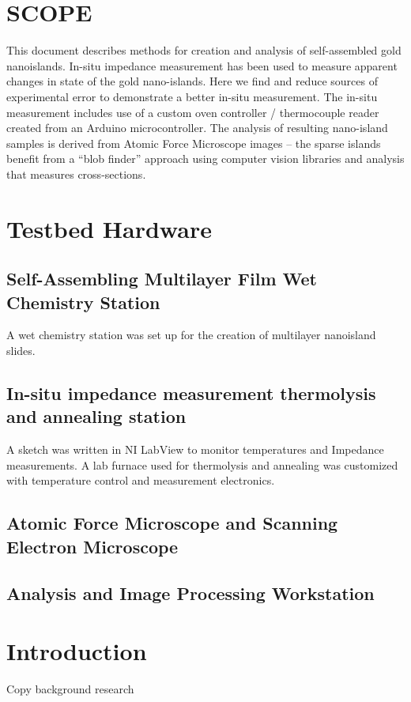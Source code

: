 \documentclass[12pt,oneside,english]{article}
\begin{document}
\section{SCOPE}
    This document describes methods for creation and analysis of self-assembled gold nanoislands.
    In-situ impedance measurement has been used to measure apparent changes in state of the gold nano-islands.
    Here we find and reduce sources of experimental error to demonstrate a better in-situ measurement.
    The in-situ measurement includes use of a custom oven controller / thermocouple reader created from an Arduino microcontroller.
    The analysis of resulting nano-island samples is derived from Atomic Force Microscope images -- the sparse islands benefit from a ``blob finder'' approach using computer vision libraries and analysis that measures cross-sections.



\section{Testbed Hardware}
    \subsection{Self-Assembling Multilayer Film Wet Chemistry Station}
        A wet chemistry station was set up for the creation of multilayer nanoisland slides.
        

    \subsection{In-situ impedance measurement thermolysis and annealing station}
    		A sketch was written in NI LabView to monitor temperatures and Impedance measurements.  A lab furnace used for thermolysis and annealing was customized with temperature control and measurement electronics.  
    		
    	\subsection{Atomic Force Microscope and Scanning Electron Microscope}
    	
    	
    	\subsection{Analysis and Image Processing Workstation}

\section{Introduction}
    Copy background research
    	
\end{document}
